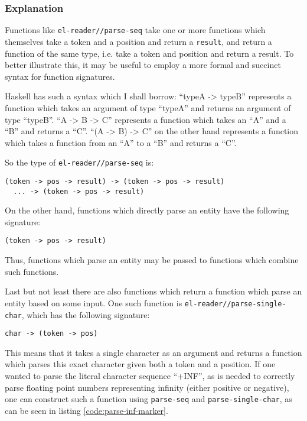\documentclass[a4paper,10pt,twoside]{report}
\newcommand{\sym}[1]{\texttt{#1}}
\newcommand{\fun}[1]{\texttt{#1}}
\begin{document}
\subsubsection{Explanation}
\label{subsubsec:parser-explanation}

Functions like \fun{el-reader//parse-seq} take one or more functions which
themselves take a token and a position and return a \sym{result}, and return a
function of the same type, i.e. take a token and position and return a result.
To better illustrate this, it may be useful to employ a more formal and succinct
syntax for function signatures.

Haskell\cite{haskell.org} has such a syntax which I shall borrow: ``typeA ->
typeB'' represents a function which takes an argument of type ``typeA'' and
returns an argument of type ``typeB''.  ``A -> B -> C'' represents a function
which takes an ``A'' and a ``B'' and returns a ``C''.  ``(A -> B) -> C'' on the
other hand represents a function which takes a function from an ``A'' to a ``B''
and returns a ``C''.

So the type of \fun{el-reader//parse-seq} is:

\begin{lstlisting}[style=lispinline]
  (token -> pos -> result) -> (token -> pos -> result)
  ... -> (token -> pos -> result)
\end{lstlisting}

On the other hand, functions which directly parse an entity have the following
signature:

\begin{lstlisting}[style=lispinline]
  (token -> pos -> result)
\end{lstlisting}

Thus, functions which parse an entity may be passed to functions which combine
such functions.

Last but not least there are also functions which return a function which parse
an entity based on some input.  One such function is
\fun{el-reader//parse-single-char}, which has the following signature:

\begin{lstlisting}[style=lispinline]
  char -> (token -> pos)
\end{lstlisting}

This means that it takes a single character as an argument and returns a
function which parses this exact character given both a token and a position.
If one wanted to parse the literal character sequence ``+INF'', as is needed to
correctly parse floating point numbers representing infinity (either positive or
negative), one can construct such a function using \fun{parse-seq} and
\fun{parse-single-char}, as can be seen in listing \ref{code:parse-inf-marker}.
\end{document}

